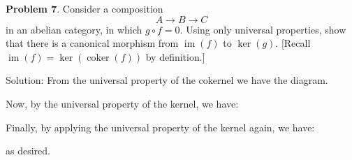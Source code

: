 \begin{dang}
    \textbf{Problem 7}. Consider a composition
\[
A\longrightarrow B\longrightarrow C
\]
in an abelian category, in which \(g\circ f = 0\). Using only universal properties, 
show that there is a canonical morphism from \(\operatorname{im}(f)\) to \(\ker(g)\). 
[Recall \(\operatorname{im}(f) = \ker(\operatorname{coker}(f))\) by definition.]
\end{dang}
Solution: From the universal property of the cokernel we have the diagram.
\begin{center}
\end{center}
Now, by the universal property of the kernel, we have:
\begin{center}
\end{center}
Finally, by applying the universal property of the kernel again, we have:
\begin{center}
\end{center}
as desired.


